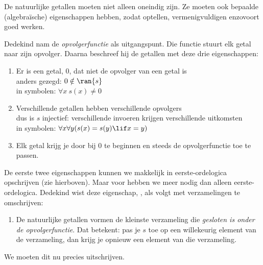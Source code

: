 \documentclass[openany]{memoir}
\begin{document}
\begingroup
\def\olfilename{OLP-0051}
\def\olfilepath{content/sets-functions-relations/infinite/}
\hypertarget{unit-OLP-0051}{}
%



De natuurlijke getallen moeten niet alleen oneindig zijn. Ze moeten ook
bepaalde (algebraïsche) eigenschappen hebben, zodat optellen,
vermenigvuldigen enzovoort goed werken.

Dedekind nam de \emph{opvolgerfunctie} als uitgangspunt. Die functie
stuurt elk getal naar zijn opvolger. Daarna beschreef hij de getallen
met deze drie eigenschappen:
\begin{enumerate}
	\item Er is een getal, $0$, dat niet de opvolger van een getal is
	\\anders gezegd: $0 \notin \ran{s}$
	\\in symbolen: $\forall x\ s(x) \neq 0$
	\item Verschillende getallen hebben verschillende opvolgers
	\\dus is $s$ injectief: verschillende invoeren krijgen verschillende uitkomsten
	\\in symbolen: $\forall x \forall y (s(x) = s(y) \lif x = y)$
	\item{} Elk getal krijg je door bij $0$ te
	beginnen en steeds de opvolgerfunctie toe te passen.
\end{enumerate}
De eerste twee eigenschappen kunnen we makkelijk in eerste-ordelogica
opschrijven (zie hierboven). Maar voor 
hebben we meer nodig dan alleen eerste-ordelogica. Dedekind wist deze
eigenschap, , als volgt met verzamelingen te
omschrijven:
\begin{enumerate}
	\item[3$'$.] De natuurlijke getallen vormen de kleinste verzameling
	die \emph{gesloten is onder de opvolgerfunctie}. Dat betekent: pas je
	$s$ toe op een willekeurig element van de verzameling, dan krijg je
	opnieuw een element van die verzameling.
\end{enumerate}
We moeten dit nu precies uitschrijven.
\end{document}
